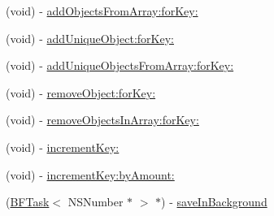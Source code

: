 \begin{DoxyCompactItemize}
\begin{DoxyCompactList}
 \end{DoxyCompactList}\item 
(void) -\/ \hyperlink{interface_p_f_object_a3c4b12bd5f7531276e0614a586d7cb9d}{add\+Objects\+From\+Array\+:for\+Key\+:}
\item 
(void) -\/ \hyperlink{interface_p_f_object_a55b0fbe1266be7219ad2386fc2367ad7}{add\+Unique\+Object\+:for\+Key\+:}
\item 
(void) -\/ \hyperlink{interface_p_f_object_a5ad1fc29f29e007f8e21fb454c5ab6b1}{add\+Unique\+Objects\+From\+Array\+:for\+Key\+:}
\item 
(void) -\/ \hyperlink{interface_p_f_object_a03f864a19b0a6ba6b6a01f5898049e49}{remove\+Object\+:for\+Key\+:}
\item 
(void) -\/ \hyperlink{interface_p_f_object_adbcf2779180aac2f2953caa9fbf30f7c}{remove\+Objects\+In\+Array\+:for\+Key\+:}
\item 
(void) -\/ \hyperlink{interface_p_f_object_aa56894782ce606ff221d224a235d11e9}{increment\+Key\+:}
\begin{DoxyCompactList}\small\item\em 

 \end{DoxyCompactList}\item 
(void) -\/ \hyperlink{interface_p_f_object_a9faadc60497971f463549a28848f4e7e}{increment\+Key\+:by\+Amount\+:}
\item 
(\hyperlink{class_b_f_task}{B\+F\+Task}$<$ N\+S\+Number $\ast$ $>$ $\ast$) -\/ \hyperlink{interface_p_f_object_a940aaed3e2e06eeb7c1bb628430e6f7f}{save\+In\+Background}
\begin{DoxyCompactList}\small\item\em 


\end{DoxyCompactList}
\end{DoxyCompactItemize}
